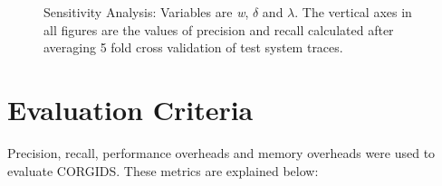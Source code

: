 \begin{figure}
    \qquad
    \caption{Sensitivity Analysis: Variables are \textit{w}, $\delta$ and $\lambda$. The vertical axes in all figures are the values of precision and recall calculated after averaging 5 fold cross validation of test system traces.}%
    \label{fig:sensitivityAnalysis}%
\end{figure}


\section{Evaluation Criteria}
\label{sec:metrics}

Precision, recall, performance overheads and memory overheads were used to evaluate CORGIDS. These metrics are explained below:

